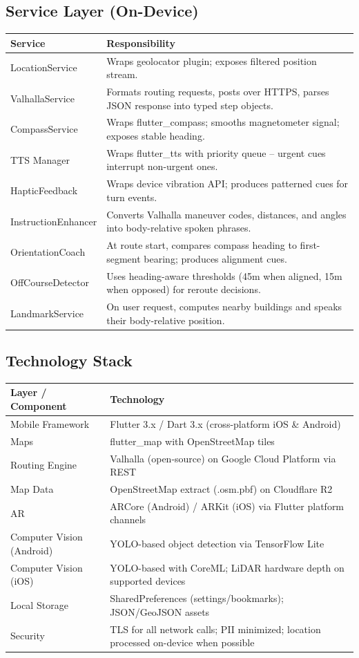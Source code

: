 \documentclass[12pt]{article}
\begin{document}
\subsection{Service Layer (On-Device)}
\begin{tabularx}{\textwidth}{|l|X|}
\hline
\textbf{Service} & \textbf{Responsibility} \\
\hline
LocationService & Wraps geolocator plugin; exposes filtered position stream. \\
\hline
ValhallaService & Formats routing requests, posts over HTTPS, parses JSON response into typed step objects. \\
\hline
CompassService & Wraps flutter\_compass; smooths magnetometer signal; exposes stable heading. \\
\hline
TTS Manager & Wraps flutter\_tts with priority queue -- urgent cues interrupt non-urgent ones. \\
\hline
HapticFeedback & Wraps device vibration API; produces patterned cues for turn events. \\
\hline
InstructionEnhancer & Converts Valhalla maneuver codes, distances, and angles into body-relative spoken phrases. \\
\hline
OrientationCoach & At route start, compares compass heading to first-segment bearing; produces alignment cues. \\
\hline
OffCourseDetector & Uses heading-aware thresholds (45m when aligned, 15m when opposed) for reroute decisions. \\
\hline
LandmarkService & On user request, computes nearby buildings and speaks their body-relative position. \\
\hline
\end{tabularx}

\subsection{Technology Stack}
\begin{tabularx}{\textwidth}{|l|X|}
\hline
\textbf{Layer / Component} & \textbf{Technology} \\
\hline
Mobile Framework & Flutter 3.x / Dart 3.x (cross-platform iOS \& Android) \\
\hline
Maps & flutter\_map with OpenStreetMap tiles \\
\hline
Routing Engine & Valhalla (open-source) on Google Cloud Platform via REST \\
\hline
Map Data & OpenStreetMap extract (.osm.pbf) on Cloudflare R2 \\
\hline
AR & ARCore (Android) / ARKit (iOS) via Flutter platform channels \\
\hline
Computer Vision (Android) & YOLO-based object detection via TensorFlow Lite \\
\hline
Computer Vision (iOS) & YOLO-based with CoreML; LiDAR hardware depth on supported devices \\
\hline
Local Storage & SharedPreferences (settings/bookmarks); JSON/GeoJSON assets \\
\hline
Security & TLS for all network calls; PII minimized; location processed on-device when possible \\
\hline
\end{tabularx}
\end{document}
